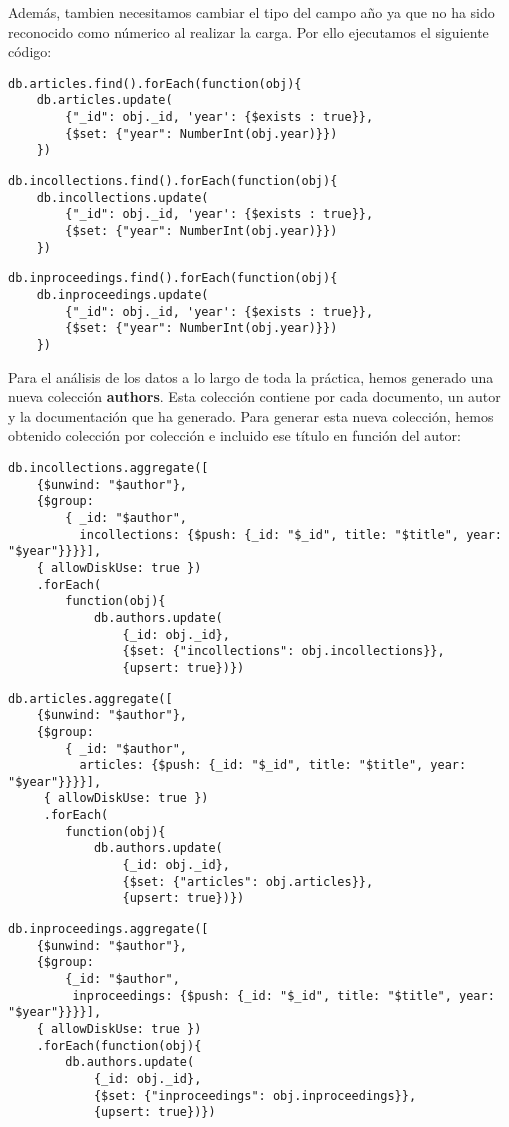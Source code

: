 Además, tambien necesitamos cambiar el tipo del campo año ya que no ha sido reconocido como númerico al realizar la carga. Por ello ejecutamos el siguiente código:
  
\begin{verbatim}
db.articles.find().forEach(function(obj){
    db.articles.update(
        {"_id": obj._id, 'year': {$exists : true}},
        {$set: {"year": NumberInt(obj.year)}})
    })
\end{verbatim}

\begin{verbatim}
db.incollections.find().forEach(function(obj){
    db.incollections.update(
        {"_id": obj._id, 'year': {$exists : true}},
        {$set: {"year": NumberInt(obj.year)}})
    })
\end{verbatim}

\begin{verbatim}
db.inproceedings.find().forEach(function(obj){
    db.inproceedings.update(
        {"_id": obj._id, 'year': {$exists : true}},
        {$set: {"year": NumberInt(obj.year)}})
    })
\end{verbatim}

Para el análisis de los datos a lo largo de toda la práctica, hemos generado una nueva colección \textbf{authors}. Esta colección contiene por cada documento, un autor y la documentación que ha generado. Para generar esta nueva colección, hemos obtenido colección por colección e incluido ese título en función del autor:

\begin{verbatim}
db.incollections.aggregate([
    {$unwind: "$author"},
    {$group:
        { _id: "$author",
          incollections: {$push: {_id: "$_id", title: "$title", year: "$year"}}}}],
    { allowDiskUse: true })
    .forEach(
        function(obj){
            db.authors.update(
                {_id: obj._id},
                {$set: {"incollections": obj.incollections}},
                {upsert: true})})
\end{verbatim}

\begin{verbatim}
db.articles.aggregate([
    {$unwind: "$author"},
    {$group:
        { _id: "$author",
          articles: {$push: {_id: "$_id", title: "$title", year: "$year"}}}}],
     { allowDiskUse: true })
     .forEach(
        function(obj){
            db.authors.update(
                {_id: obj._id},
                {$set: {"articles": obj.articles}},
                {upsert: true})})
\end{verbatim}

\begin{verbatim}
db.inproceedings.aggregate([
    {$unwind: "$author"},
    {$group: 
        {_id: "$author",
         inproceedings: {$push: {_id: "$_id", title: "$title", year: "$year"}}}}],
    { allowDiskUse: true })
    .forEach(function(obj){
        db.authors.update(
            {_id: obj._id},
            {$set: {"inproceedings": obj.inproceedings}},
            {upsert: true})})
\end{verbatim}


